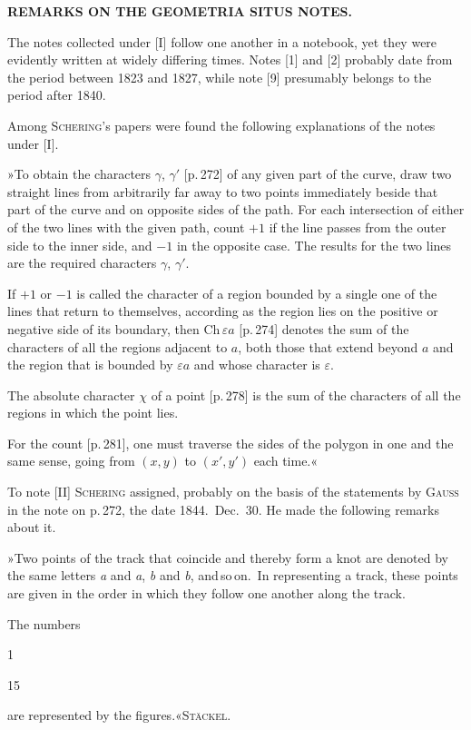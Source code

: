 \clearpage{}

\begin{center}
\textbf{REMARKS ON THE GEOMETRIA SITUS NOTES.}
\end{center}

The notes collected under [I] follow one another in a
notebook, yet they were evidently written at widely differing
times. Notes [1] and [2] probably date
from the period between 1823 and 1827, while note [9] presumably
belongs to the period after 1840.

Among \textsc{Schering}'s papers were found the following explanations of the notes under
[I].

»To obtain the characters $\gamma$, $\gamma'$ [p.\,272] of any given
part of the curve, draw two straight lines from arbitrarily far away to
two points immediately beside that part of the curve and on opposite
sides of the path. For each
intersection of either of the two lines with the given path,
count $+1$ if the line passes from the outer side to the inner side, and
$-1$ in the opposite case. The results for the two lines are
the required characters $\gamma$, $\gamma'$.

If $+1$ or $-1$ is called the character of a region bounded by a single
one of the lines that return to themselves, according as the
region lies on the positive or negative side of its boundary, then
$\mathrm{Ch}\,\varepsilon a$ [p.\,274] denotes the sum of the
characters of all the regions adjacent to $a$, both those
that extend beyond $a$ and the region that is bounded by
$\varepsilon a$ and whose character is $\varepsilon$.

The absolute character $\chi$ of a point [p.\,278] is the sum of the
characters of all the regions in which the point lies.

For the count [p.\,281], one must traverse the sides of the polygon in one and
the same sense, going from $(x, y)$ to $(x', y')$
each time.«

To note [II] \textsc{Schering} assigned, probably on the basis of the statements
by \textsc{Gauss} in the note on p.\,272, the date 1844.\ Dec.\ 30.
He made the following remarks about it.

»Two points of the track that coincide and thereby form a knot
are denoted by the same letters \emph{a} and \emph{a}, \emph{b} and
\emph{b}, and\,so\,on.\ In representing a track,
these points are given in the order in which they follow one another
along the track.

The numbers

\begin{center}
1    

15
\end{center}

are represented by the figures.«\hfill \textsc{Stäckel}.
